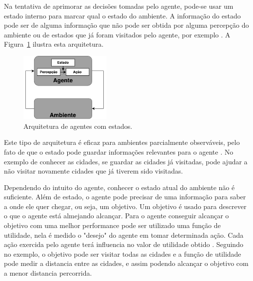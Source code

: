 Na tentativa de aprimorar as decisões tomadas pelo agente, pode-se usar um estado interno para marcar qual o estado do ambiente. A informação do estado pode ser de alguma informação que não pode ser obtida por alguma percepção do ambiente ou de estados que já foram visitados pelo agente, por exemplo \cite{intelligence2003modern}. A Figura~\ref{fig:agenteModelbased} ilustra esta arquitetura. 

\begin{figure}[ht]
	\centering
	\includegraphics[width=0.4\textwidth]{fig/agentModel.pdf}
	\caption{Arquitetura de agentes com estados.}
	\label{fig:agenteModelbased}
\end{figure} 

Este tipo de arquitetura é eficaz para ambientes parcialmente observáveis, pelo fato de que o estado pode guardar informações relevantes para o agente \cite{intelligence2003modern}. No exemplo de conhecer as cidades, se guardar as cidades já visitadas, pode ajudar a não visitar novamente cidades que já tiverem sido visitadas. 

Dependendo do intuito do agente, conhecer o estado atual do ambiente não é suficiente. Além de estado, o agente pode precisar de uma informação para saber a onde ele quer chegar, ou seja, um objetivo. Um objetivo é usado para descrever o que o agente está almejando alcançar. Para o agente conseguir alcançar o objetivo com uma melhor performance pode ser utilizado uma função de utilidade, nela é medido o "desejo" do agente em tomar determinada ação. Cada ação exercida pelo agente terá influencia no valor de utilidade obtido \cite{intelligence2003modern}. Seguindo no exemplo, o objetivo pode ser visitar todas as cidades e a função de utilidade pode medir a distancia entre as cidades, e assim podendo alcançar o objetivo com a menor distancia percorrida. 



